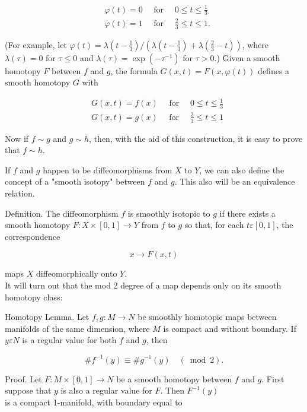 \documentclass[10pt, letterpaper]{article}
\begin{document}
\[
\begin{aligned}
& \varphi(t)=0 \quad \text { for } \quad 0 \leq t \leq \frac{1}{3} \\
& \varphi(t)=1 \quad \text { for } \quad \frac{2}{3} \leq t \leq 1 .
\end{aligned}
\]


(For example, let $\varphi(t)=\lambda\left(t-\frac{1}{3}\right) /\left(\lambda\left(t-\frac{1}{3}\right)+\lambda\left(\frac{2}{3}-t\right)\right)$, where $\lambda(\tau)=0$ for $\tau \leq 0$ and $\lambda(\tau)=\exp \left(-\tau^{-1}\right)$ for $\tau>0$.) Given a smooth homotopy $F$ between $f$ and $g$, the formula $G(x, t)=F(x, \varphi(t))$ defines a smooth homotopy $G$ with


\[
\begin{aligned}
& G(x, t)=f(x) \quad \text { for } \quad 0 \leq t \leq \frac{1}{3} \\
& G(x, t)=g(x) \quad \text { for } \quad \frac{2}{3} \leq t \leq 1
\end{aligned}
\]

Now if $f \sim g$ and $g \sim h$, then, with the aid of this construction, it is easy to prove that $f \sim h$.

If $f$ and $g$ happen to be diffeomorphisms from $X$ to $Y$, we can also define the concept of a "smooth isotopy" between $f$ and $g$. This also will be an equivalence relation.

Definition. The diffeomorphism $f$ is smoothly isotopic to $g$ if there exists a smooth homotopy $F: X \times[0,1] \rightarrow Y$ from $f$ to $g$ so that, for each $t \varepsilon[0,1]$, the correspondence

$$
x \rightarrow F(x, t)
$$

maps $X$ diffeomorphically onto $Y$.\\
It will turn out that the mod 2 degree of a map depends only on its smooth homotopy class:

Homotopy Lemma. Let $f, g: M \rightarrow N$ be smoothly homotopic maps between manifolds of the same dimension, where $M$ is compact and without boundary. If $y \varepsilon N$ is a regular value for both $f$ and $g$, then

$$
\# f^{-1}(y) \equiv \# g^{-1}(y) \quad(\bmod 2) .
$$

Proof. Let $F: M \times[0,1] \rightarrow N$ be a smooth homotopy between $f$ and $g$. First suppose that $y$ is also a regular value for $F$. Then $F^{-1}(y)$\\
is a compact 1-manifold, with boundary equal to
\end{document}
